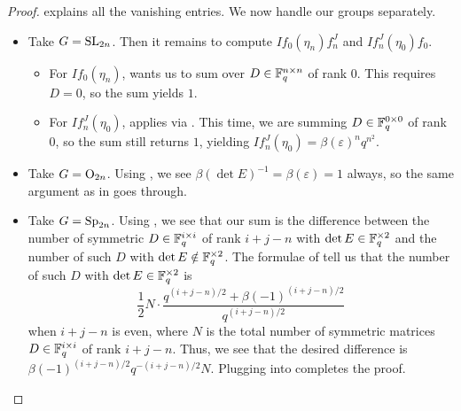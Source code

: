 \begin{proof}
     explains all the vanishing entries. We now handle our groups separately.
    \begin{itemize}
        \item Take $G=\mathrm{SL}_{2n}$. Then it remains to compute $If_0(\eta_n)f_n^J$ and $If_n^J(\eta_0)f_0$.
    	\begin{itemize}
    		\item For $If_0(\eta_n)$,  wants us to sum over $D\in\mathbb F_q^{n\times n}$ of rank $0$. This requires $D=0$, so the sum yields $1$.
    		\item For $If_n^J(\eta_0)$,  applies via  . This time, we are summing $D\in\mathbb F_q^{0\times0}$ of rank $0$, so the sum still returns $1$, yielding $If_n^J(\eta_0)=\beta(\varepsilon)^nq^{n^2}$.
    	\end{itemize}
        \item Take $G=\mathrm{O}_{2n}$. Using , we see $\beta(\det E)^{-1}=\beta(\varepsilon)=1$ always, so the same argument as in  goes through.
        \item Take $G=\mathrm{Sp}_{2n}$. Using , we see that our sum is the difference between the number of symmetric $D\in\mathbb F_q^{i\times i}$ of rank $i+j-n$ with $\det E\in\mathbb F_q^{\times2}$ and the number of such $D$ with $\det E\notin\mathbb F_q^{\times2}$. The formulae of \cite{macwilliams-ortho-matrices} tell us that the number of such $D$ with $\det E\in\mathbb F_q^{\times2}$ is
        \[\frac12N\cdot\frac{q^{(i+j-n)/2}+\beta(-1)^{(i+j-n)/2}}{q^{(i+j-n)/2}}\]
        when $i+j-n$ is even,
    	where $N$ is the total number of symmetric matrices $D\in\mathbb F_q^{i\times i}$ of rank $i+j-n$. Thus, we see that the desired difference is $\beta(-1)^{(i+j-n)/2}q^{-(i+j-n)/2}N$. Plugging into  completes the proof.
        \qedhere
    \end{itemize}
\end{proof}
